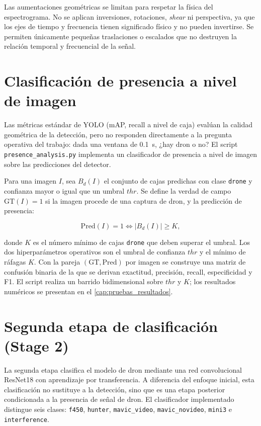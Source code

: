 Las aumentaciones geométricas se limitan para respetar la física del espectrograma. No se aplican inversiones, rotaciones, \emph{shear} ni perspectiva, ya que los ejes de tiempo y frecuencia tienen significado físico y no pueden invertirse. Se permiten únicamente pequeñas traslaciones o escalados que no destruyen la relación temporal y frecuencial de la señal.

\section{Clasificación de presencia a nivel de imagen}
\label{sec:implementacion_presencia}

Las métricas estándar de YOLO (mAP, recall a nivel de caja) evalúan la calidad geométrica de la detección, pero no responden directamente a la pregunta operativa del trabajo: dada una ventana de \SI{0.1}{\second}, ¿hay dron o no? El script \texttt{presence\_analysis.py} implementa un clasificador de presencia a nivel de imagen sobre las predicciones del detector.

Para una imagen $I$, sea $B_d(I)$ el conjunto de cajas predichas con clase \texttt{drone} y confianza mayor o igual que un umbral $\mathit{thr}$. Se define la verdad de campo $\mathrm{GT}(I) = 1$ si la imagen procede de una captura de dron, y la predicción de presencia:

\begin{equation}
\mathrm{Pred}(I) = 1 \iff |B_d(I)| \ge K,
\end{equation}

donde $K$ es el número mínimo de cajas \texttt{drone} que deben superar el umbral. Los dos hiperparámetros operativos son el umbral de confianza $\mathit{thr}$ y el mínimo de ráfagas $K$. Con la pareja $(\mathrm{GT}, \mathrm{Pred})$ por imagen se construye una matriz de confusión binaria de la que se derivan exactitud, precisión, recall, especificidad y F1. El script realiza un barrido bidimensional sobre $\mathit{thr}$ y $K$; los resultados numéricos se presentan en el \cref{cap:pruebas_resultados}.

\section{Segunda etapa de clasificación (Stage 2)}
\label{sec:implementacion_stage2}

La segunda etapa clasifica el modelo de dron mediante una red convolucional ResNet18 con aprendizaje por transferencia. A diferencia del enfoque inicial, esta clasificación no sustituye a la detección, sino que es una etapa posterior condicionada a la presencia de señal de dron. El clasificador implementado distingue seis clases: \texttt{f450}, \texttt{hunter}, \texttt{mavic\_video}, \texttt{mavic\_novideo}, \texttt{mini3} e \texttt{interference}.


